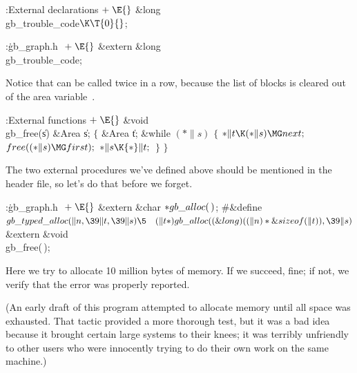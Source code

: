 \B{}:External declarations\X${}\mathrel+\E{}$\6
\&{long} \\{gb\_trouble\_code}${}\K\T{0}{}$;\par
\fi

\B{}:\.{gb\_graph.h }\X${}\mathrel+\E{}$\6
\&{extern} \&{long} \\{gb\_trouble\_code};\par
\fi

Notice that  can be called twice in a row, because
the list
of blocks is cleared out of the area variable~.

\Y\B\4:External functions\X${}\mathrel+\E{}$\6
\1\1\&{void} \\{gb\_free}(\|s)\6
\&{Area} \|s;\2\2\6
${}\{{}$\5
\1\&{Area} \|t;\7
\&{while} ${}({*}\|s){}$\5
${}\{{}$\1\6
${}{*}\|t\K({*}\|s)\MG\\{next};{}$\6
${}\\{free}(({*}\|s)\MG\\{first});{}$\6
${}{*}\|s\K{*}\|t;{}$\6
\4${}\}{}$\2\6
\4${}\}{}$\2\par
\fi

The two external procedures we've defined above should be mentioned in
the header file, so let's do that before we forget.

\Y\B\4:\.{gb\_graph.h }\X${}\mathrel+\E{}$\6
\&{extern} \&{char} ${}{*}\\{gb\_alloc}(\,){}$;\6
\8\#\&{define} ${}\\{gb\_typed\_alloc}(\|n,\39\|t,\39\|s)\5\hbox{\quad}(\|t*)%
\\{gb\_alloc}((\&{long})((\|n)*\&{sizeof}(\|t)),\39\|s){}$\6
\&{extern} \&{void} \\{gb\_free}(\,);\par
\fi

Here we try to allocate 10 million bytes of memory. If we succeed,
fine; if not, we verify that the error was properly reported.

(An early draft of this program attempted to allocate memory until all
space was exhausted. That tactic provided a more thorough test, but it
was a bad idea because it brought certain large systems to their
knees; it was terribly unfriendly to other users who were innocently
trying to do their own work on the same machine.)

